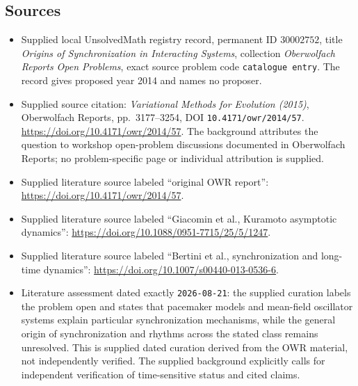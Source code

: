 \documentclass[11pt]{article}
\begin{document}
\subsection{Sources}
\begin{itemize}
\item Supplied local UnsolvedMath registry record, permanent ID \(30002752\), title \emph{Origins of Synchronization in Interacting Systems}, collection \emph{Oberwolfach Reports Open Problems}, exact source problem code \texttt{catalogue entry}. The record gives proposed year 2014 and names no proposer.
\item Supplied source citation: \emph{Variational Methods for Evolution (2015)}, Oberwolfach Reports, pp.~3177--3254, DOI \texttt{10.4171/owr/2014/57}. \url{https://doi.org/10.4171/owr/2014/57}. The background attributes the question to workshop open-problem discussions documented in Oberwolfach Reports; no problem-specific page or individual attribution is supplied.
\item Supplied literature source labeled ``original OWR report'': \url{https://doi.org/10.4171/owr/2014/57}.
\item Supplied literature source labeled ``Giacomin et al., Kuramoto asymptotic dynamics'': \url{https://doi.org/10.1088/0951-7715/25/5/1247}.
\item Supplied literature source labeled ``Bertini et al., synchronization and long-time dynamics'': \url{https://doi.org/10.1007/s00440-013-0536-6}.
\item Literature assessment dated exactly \texttt{2026-08-21}: the supplied curation labels the problem open and states that pacemaker models and mean-field oscillator systems explain particular synchronization mechanisms, while the general origin of synchronization and rhythms across the stated class remains unresolved. This is supplied dated curation derived from the OWR material, not independently verified. The supplied background explicitly calls for independent verification of time-sensitive status and cited claims.
\end{itemize}
\end{document}
